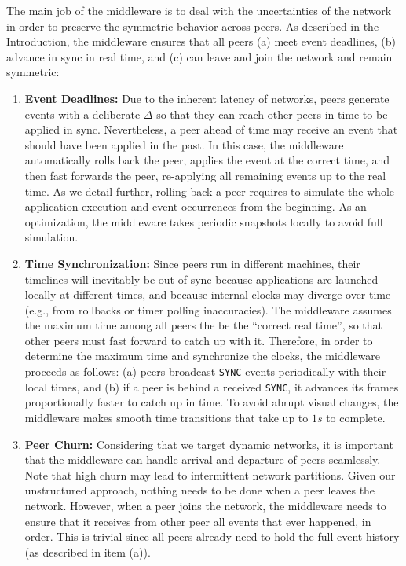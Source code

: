 \documentclass[12pt]{article}
\newcommand{\code}[1]  {\texttt{\small{#1}}}
\begin{document}
The main job of the middleware is to deal with the uncertainties of the
network in order to preserve the symmetric behavior across peers.
As described in the Introduction, the middleware ensures that all peers
    (a) meet event deadlines,
    (b) advance in sync in real time, and
    (c) can leave and join the network and remain symmetric:
%
\begin{enumerate}
\item \textbf{Event Deadlines:}
Due to the inherent latency of networks, peers generate events with a
deliberate $\Delta$ so that they can reach other peers in time to be applied in
sync.
Nevertheless, a peer ahead of time may receive an event that should have been
applied in the past. %
In this case, the middleware automatically rolls back the peer, applies the
event at the correct time, and then fast forwards the peer, re-applying all
remaining events up to the real time.
As we detail further, rolling back a peer requires to simulate the whole
application execution and event occurrences from the beginning.
As an optimization, the middleware takes periodic snapshots locally to avoid
full simulation.
%
\item \textbf{Time Synchronization:}
Since peers run in different machines, their timelines will inevitably be out
of sync because applications are launched locally at different times, and
because internal clocks may diverge over time (e.g., from rollbacks or timer
polling inaccuracies).
The middleware assumes the maximum time among all peers the be the
``correct real time'', so that other peers must fast forward to catch up with
it.
Therefore, in order to determine the maximum time and synchronize the clocks,
the middleware proceeds as follows:
    (a) peers broadcast \code{SYNC} events periodically with their local
        times, and
    (b) if a peer is behind a received \code{SYNC}, it advances its frames
        proportionally faster to catch up in time.
%
To avoid abrupt visual changes, the middleware makes smooth time transitions
that take up to $1s$ to complete.
%
\item \textbf{Peer Churn:}
Considering that we target dynamic networks, it is important that the
middleware can handle arrival and departure of peers seamlessly.
Note that high churn may lead to intermittent network partitions.
Given our unstructured approach, nothing needs to be done when a peer leaves
the network.
However, when a peer joins the network, the middleware needs to ensure that it
receives from other peer all events that ever happened, in order.
This is trivial since all peers already need to hold the full event history (as
described in item (a)).
\end{enumerate}
\end{document}
